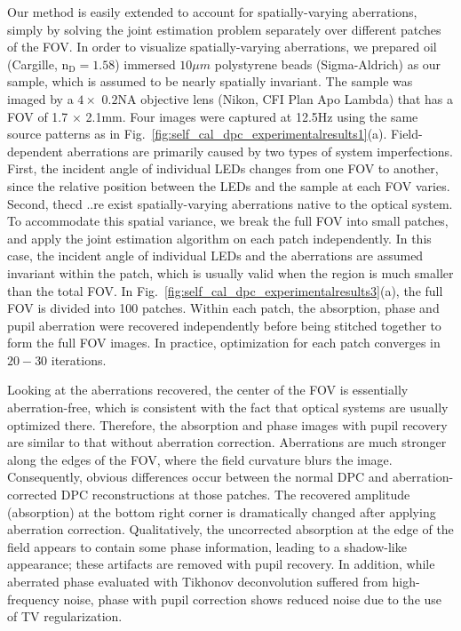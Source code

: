 Our method is easily extended to account for spatially-varying aberrations, simply by solving the joint estimation problem separately over different patches of the FOV. In order to visualize spatially-varying aberrations, we prepared oil (Cargille, $\mathrm{n}_{\mathrm{D}}=1.58$) immersed $10\mu m$ polystyrene beads (Sigma-Aldrich) as our sample, which is assumed to be nearly spatially invariant. The sample was imaged by a $4\times$ $0.2 \mathrm{NA}$ objective lens (Nikon, CFI Plan Apo Lambda) that has a FOV of 1.7 $\times$ 2.1mm. Four images were captured at 12.5Hz using the same source patterns as in Fig.~\ref{fig:self_cal_dpc_experimentalresults1}(a). Field-dependent aberrations are primarily caused by two types of system imperfections. First, the incident angle of individual LEDs changes from one FOV to another, since the relative position between the LEDs and the sample at each FOV varies. Second, thecd ..re exist spatially-varying aberrations native to the optical system. To accommodate this spatial variance, we break the full FOV into small patches, and apply the joint estimation algorithm on each patch independently. In this case, the incident angle of individual LEDs and the aberrations are assumed invariant within the patch, which is usually valid when the region is much smaller than the total FOV. In Fig.~\ref{fig:self_cal_dpc_experimentalresults3}(a), the full FOV is divided into 100 patches. Within each patch, the absorption, phase and pupil aberration were recovered independently before being stitched together to form the full FOV images. In practice, optimization for each patch converges in $20-30$ iterations. 

Looking at the aberrations recovered, the center of the FOV is essentially aberration-free, which is consistent with the fact that optical systems are usually optimized there. Therefore, the absorption and phase images with pupil recovery are similar to that without aberration correction. Aberrations are much stronger along the edges of the FOV, where the field curvature blurs the image. Consequently, obvious differences occur between the normal DPC and aberration-corrected DPC reconstructions at those patches. The recovered amplitude (absorption) at the bottom right corner is dramatically changed after applying aberration correction. Qualitatively, the uncorrected absorption at the edge of the field appears to contain some phase information, leading to a shadow-like appearance; these artifacts are removed with pupil recovery. In addition, while aberrated phase evaluated with Tikhonov deconvolution suffered from high-frequency noise, phase with pupil correction shows reduced noise due to the use of TV regularization.

